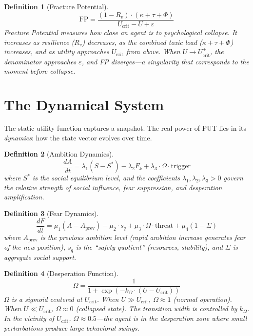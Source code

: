 \documentclass[12pt, a4paper]{article}
\newtheorem{definition}{Definition}[section]
\theoremstyle{remark}
\newcommand{\Ucrit}{U_{\text{crit}}}
\newcommand{\Fk}{F_k}
\newcommand{\ddt}[1]{\frac{d#1}{dt}}
\begin{document}
\begin{definition}[Fracture Potential]\label{def:fp}
\begin{equation}
    \text{FP} = \frac{(1 - R_v) \cdot (\kappa + \tau + \Phi)}{\Ucrit - U + \varepsilon}
\end{equation}
Fracture Potential measures how close an agent is to psychological collapse.
It increases as resilience ($R_v$) decreases, as the combined toxic load
($\kappa + \tau + \Phi$) increases, and as utility approaches $\Ucrit$
from above. When $U \to \Ucrit^+$, the denominator approaches $\varepsilon$,
and FP diverges---a singularity that corresponds to the moment before
collapse.
\end{definition}

\section{The Dynamical System}

The static utility function captures a snapshot. The real power of PUT
lies in its \emph{dynamics}: how the state vector evolves over time.

\begin{definition}[Ambition Dynamics]\label{def:dA}
\begin{equation}\label{eq:dA}
    \ddt{A} = \lambda_1 (S - S^*) - \lambda_2 \Fk + \lambda_3 \cdot \Omega \cdot \text{trigger}
\end{equation}
where $S^*$ is the social equilibrium level, and the coefficients
$\lambda_1, \lambda_2, \lambda_3 > 0$ govern the relative strength
of social influence, fear suppression, and desperation amplification.
\end{definition}

\begin{definition}[Fear Dynamics]\label{def:dF}
\begin{equation}\label{eq:dF}
    \ddt{F} = \mu_1 (A - A_{\text{prev}}) - \mu_2 \cdot s_q
              + \mu_3 \cdot \Omega \cdot \text{threat}
              + \mu_4 (1 - \Sigma)
\end{equation}
where $A_{\text{prev}}$ is the previous ambition level (rapid ambition
increase generates fear of the new position), $s_q$ is the ``safety
quotient'' (resources, stability), and $\Sigma$ is aggregate social
support.
\end{definition}

\begin{definition}[Desperation Function]\label{def:omega}
\begin{equation}\label{eq:omega}
    \Omega = \frac{1}{1 + \exp(-k_\Omega \cdot (U - \Ucrit))}
\end{equation}
$\Omega$ is a sigmoid centered at $\Ucrit$. When $U \gg \Ucrit$,
$\Omega \approx 1$ (normal operation). When $U \ll \Ucrit$,
$\Omega \approx 0$ (collapsed state). The transition width is
controlled by $k_\Omega$. In the vicinity of $\Ucrit$,
$\Omega \approx 0.5$---the agent is in the desperation zone where
small perturbations produce large behavioral swings.
\end{definition}
\end{document}
